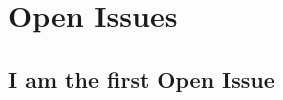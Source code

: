 \documentclass[11pt,fleqn]{book} %
\begin{document}
	
	


\chapter{Open Issues}

\section{I am the first Open Issue}
\end{document}

